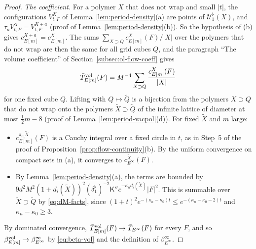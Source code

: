\begin{proof}
\emph{The coefficient.} For a polymer $X$ that does not wrap and small $|t|$, the configurations $V^X_{t,F}$ of Lemma~\ref{lem:period-density}(a) are points of $\mathcal U^\flat_1(X)$, and $\tau_aV^X_{t,F}=V^{X+a}_{t,F}$ (proof of Lemma~\ref{lem:period-density}(b)). So the hypothesis of (b) gives $c^{X+a}_{E[m]}=c^X_{E[m]}$. The sums $\sum_{X\supset Q}c^X_{E[m]}(F)/|X|$ over the polymers that do not wrap are then the same for all grid cubes $Q$, and the paragraph ``The volume coefficient'' of Section~\ref{subsec:ol-flow-coeff} gives
\[
\bar T^{\rm vol}_{E[m]}(F)=M^{-4}\sum_{X\supset Q}\frac{c^X_{E[m]}(F)}{|X|}
\]
for one fixed cube $Q$. Lifting with $Q\mapsto\tilde Q$ is a bijection from the polymers $X\supset Q$ that do not wrap onto the polymers $\tilde X\supset\tilde Q$ of the infinite lattice of diameter at most $\frac12m-8$ (proof of Lemma~\ref{lem:period-vacpol}(d)). For fixed $\tilde X$ and $m$ large:
\begin{itemize}
\item $c^{\pi_m\tilde X}_{E[m]}(F)$ is a Cauchy integral over a fixed circle in $t$, as in Step~5 of the proof of Proposition~\ref{prop:flow-continuity}(b). By the uniform convergence on compact sets in (a), it converges to $c^{\tilde X}_{E^\infty}(F)$.
\item By Lemma~\ref{lem:period-density}(a), the terms are bounded by $9d^2M^2(1+d_i(\tilde X))^2(\delta_1^\flat)^{-2}\mathsf K''e^{-\kappa_nd_i(\tilde X)}|F|^2$. This is summable over $\tilde X\supset\tilde Q$ by \eqref{eq:dM-facts}, since $(1+t)^2e^{-(\kappa_n-\kappa_0)t}\le e^{-(\kappa_n-\kappa_0-2)t}$ and $\kappa_n-\kappa_0\ge3$.
\end{itemize}
By dominated convergence, $\bar T^{\rm vol}_{E[m]}(F)\to\bar T_{E^\infty}(F)$ for every $F$, and so $\beta^{\rm vol}_{E[m]}\to\beta^\infty_{E^\infty}$ by \eqref{eq:beta-vol} and the definition of $\beta^\infty_{E^\infty}$.


\end{proof}
